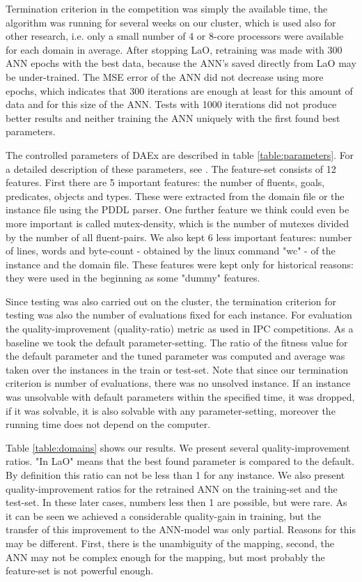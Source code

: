 \documentclass{acm_proc_article-sp}
\begin{document}
Termination criterion in the competition was simply the available time, the algorithm was running for several weeks on our cluster, which is used also for other research, i.e. only a small number of 4 or 8-core processors were available for each domain in average. After stopping LaO, retraining was made with 300 ANN epochs with the best data, because the ANN's saved directly from LaO may be under-trained. The MSE error of the ANN did not decrease using more epochs, which indicates that 300 iterations are enough at least for this amount of data and for this size of the ANN. Tests with 1000 iterations did not produce better results and neither training the ANN uniquely with the first found best parameters.

The controlled parameters of DAEx are described in table \ref{table:parameters}. For a detailed description of these parameters, see \cite{BibGECCO:2010}. The feature-set consists of 12 features. First there are 5 important features: the number of fluents, goals, predicates, objects and types. These were extracted from the domain file or the instance file using the PDDL parser. One further feature we think could even be more important is called mutex-density, which is the number of mutexes divided by the number of all fluent-pairs. We also kept 6 less important features: number of lines, words and byte-count - obtained by the linux command "wc" - of the instance and the domain file. These features were kept only for historical reasons: they were used in the beginning as some "dummy" features.

Since testing was also carried out on the cluster, the termination criterion for testing was also the number of evaluations fixed for each instance. For evaluation the quality-improvement (quality-ratio) metric as used in IPC competitions. As a baseline we took the default parameter-setting. The ratio of the fitness value for the default parameter and the tuned parameter was computed and average was taken over the instances in the train or test-set. Note that since our termination criterion is number of evaluations, there was no unsolved instance. If an instance was unsolvable with default parameters within the specified time, it was dropped, if it was solvable, it is also solvable with any parameter-setting, moreover the running time does not depend on the computer. 

Table \ref{table:domains} shows our results. We present several quality-improvement ratios. "In LaO" means that the best found parameter is compared to the default. By definition this ratio can not be less than 1 for any instance. We also present quality-improvement ratios for the retrained ANN on the training-set and the test-set. In these later cases, numbers less then 1 are possible, but were rare. As it can be seen we achieved a considerable quality-gain in training, but the transfer of this improvement to the ANN-model was only partial. Reasons for this may be different. First, there is the unambiguity of the mapping, second, the ANN may not be complex enough for the mapping, but most probably the feature-set is not powerful enough. 
\end{document}
